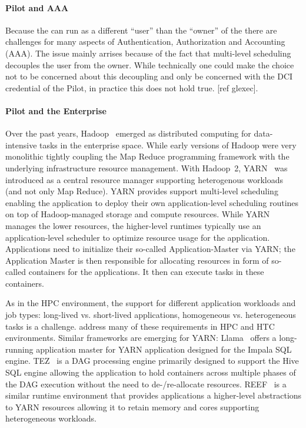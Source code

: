 \documentclass{sig-alternate}
\begin{document}
\paragraph*{Pilot and AAA} Because the \pilot can run as a different ``user''
than the ``owner'' of the  there are challenges for many aspects of
Authentication, Authorization and Accounting (AAA).
The issue mainly arrises because of the fact that multi-level scheduling
decouples the  user from the  owner.
While technically one could make the choice not to be concerned about this
decoupling and only be concerned with the DCI credential of the Pilot, in
practice this does not hold true.
[ref glexec].

\paragraph*{Pilot and the Enterprise} Over the past years,
Hadoop~\cite{hadoop} emerged as distributed computing for data-intensive
tasks in the enterprise space. While early versions of Hadoop were very
monolithic tightly coupling the Map Reduce programming framework with
the underlying infrastructure resource management. With Hadoop~2,
YARN~\cite{yarn-paper} was introduced as a central resource manager
supporting heterogenous workloads (and not only Map Reduce). YARN
provides support multi-level scheduling enabling the application to
deploy their own application-level scheduling routines on top of
Hadoop-managed storage and compute resources. While YARN manages the
lower resources, the higher-level runtimes typically use an
application-level scheduler to optimize resource usage for the
application. Applications need to initialize their so-called
Application-Master via YARN; the Application Master is then responsible
for allocating resources in form of so-called containers for the
applications. It then can execute tasks in these containers.

As in the HPC environment, the support for different application
workloads and job types: long-lived vs. short-lived applications,
homogeneous vs. heterogeneous tasks is a challenge. \pilots address many
of these requirements in HPC and HTC environments. Similar frameworks
are emerging for YARN: Llama~\cite{llama} offers a long-running
application master for YARN application designed for the Impala SQL
engine. TEZ~\cite{tez} is a DAG processing engine primarily designed to
support the Hive SQL engine allowing the application to hold containers
across multiple phases of the DAG execution without the need to
de-/re-allocate resources. REEF~\cite{Chun:2013:RRE:2536274.2536318} is
a similar runtime environment that provides applications a higher-level
abstractions to YARN resources allowing it to retain memory and cores
supporting heterogeneous workloads.
\end{document}
